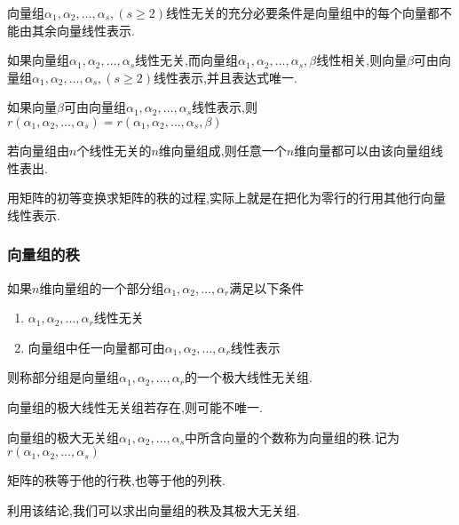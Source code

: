 \begin{ttheorem}
    向量组$\alpha_1,\alpha_2,\dots,\alpha_s,(s \geqslant 2)$线性无关的充分必要条件是向量组中的每个向量都不能由其余向量线性表示.
\end{ttheorem}

\begin{ttheorem}
    如果向量组$\alpha_1,\alpha_2,\dots,\alpha_s$线性无关,而向量组$\alpha_1,\alpha_2,\dots,\alpha_s,\beta$线性相关,则向量$\beta$可由向量组$\alpha_1,\alpha_2,\dots,\alpha_s,(s \geqslant 2)$线性表示,并且表达式唯一.
\end{ttheorem}

\begin{ttheorem}
    如果向量$\beta$可由向量组$\alpha_1,\alpha_2,\dots,\alpha_s$线性表示,则$r(\alpha_1,\alpha_2,\dots,\alpha_s)=r(\alpha_1,\alpha_2,\dots,\alpha_s,\beta)$
\end{ttheorem}

\begin{ttheorem}
    若向量组由$n$个线性无关的$n$维向量组成,则任意一个$n$维向量都可以由该向量组线性表出.
\end{ttheorem}
用矩阵的初等变换求矩阵的秩的过程,实际上就是在把化为零行的行用其他行向量线性表示.

\subsubsection{向量组的秩}
\begin{definition}
    如果$n$维向量组的一个部分组$\alpha_1,\alpha_2,\dots,\alpha_r$满足以下条件
    \begin{enumerate}
        \item $\alpha_1,\alpha_2,\dots,\alpha_r$线性无关
        \item 向量组中任一向量都可由$\alpha_1,\alpha_2,\dots,\alpha_r$线性表示
    \end{enumerate}
    则称部分组是向量组$\alpha_1,\alpha_2,\dots,\alpha_r$的一个极大线性无关组.
\end{definition}
向量组的极大线性无关组若存在,则可能不唯一.
\begin{definition}
    向量组的极大无关组$\alpha_1,\alpha_2,\dots,\alpha_s$中所含向量的个数称为向量组的秩.记为$r(\alpha_1,\alpha_2,\dots,\alpha_s)$
\end{definition}

\begin{ttheorem}
    矩阵的秩等于他的行秩,也等于他的列秩.
\end{ttheorem}
利用该结论,我们可以求出向量组的秩及其极大无关组.

